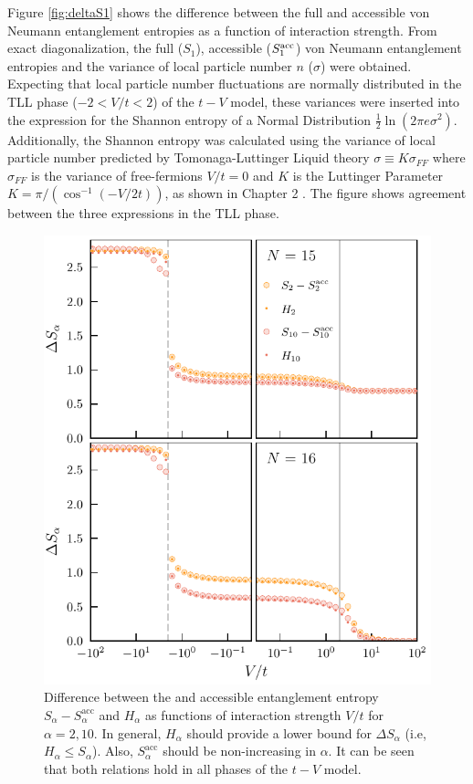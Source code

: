 %
Figure \ref{fig:deltaS1} shows the difference between the full and accessible von Neumann entanglement entropies as a function of interaction strength. From exact diagonalization, the full ($S_1$), accessible ($S_{1}^{\rm acc}$) von Neumann entanglement entropies and the variance of local particle number $n$ ($\sigma$) were obtained. Expecting that local particle number fluctuations are normally distributed in the TLL phase ($-2 < V/t < 2$) of the $t-V$ model, these variances were inserted into the expression for the Shannon entropy of a Normal Distribution $\frac{1}{2}\ln{\left( 2\pi e \sigma^2 \right)}$. Additionally, the Shannon entropy was calculated using the variance of local particle number predicted by Tomonaga-Luttinger Liquid theory $\sigma \equiv K\sigma_{FF}$ where $\sigma_{FF}$ is the variance of free-fermions $V/t = 0$ and $K$ is the Luttinger Parameter $K = \pi/(\cos^{-1}\left( -V/2t \right))$, as shown in Chapter 2 . The figure shows agreement between the three expressions in the TLL phase.


\begin{figure}[h!]
\begin{center}
\includegraphics[scale=1.0]{Images/higherAlphaDeltaS_N15N16.pdf}
\end{center}
\caption{Difference between the \ren and accessible entanglement entropy $S_{\alpha} - S_{\alpha}^{\mathrm{acc}}$ and $H_{\alpha}$ as functions of interaction strength $V/t$ for $\alpha=2,10$. In general, $H_{\alpha}$ should provide a lower bound for $\Delta S_{\alpha}$ (i.e, $H_{\alpha} \leq S_{\alpha}$). Also, $S_{\alpha}^{\mathrm{acc}}$ should be non-increasing in $\alpha$. It can be seen that both relations hold in all phases of the $t-V$ model.}
\label{fig:deltaS_alpha}
\end{figure}

